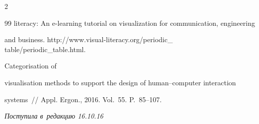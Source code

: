 \begin{multicols}{2}
{{\begin{thebibliography}{99}
literacy: An e-learning tutorial on visualization for communication, engineering 


and business. {\sf http://www.visual-literacy.org/periodic\_ table/periodic\_table.html}.




   Categorisation of 


visualisation methods to support the design of human--computer interaction 


systems~// Appl. Ergon., 2016. Vol.~55. P.~85--107.


 \end{thebibliography}





 }


 }





\end{multicols}





\vspace*{-3pt}





\hfill{\small\textit{Поступила в~редакцию 16.10.16}}










\newpage





\vspace*{-28pt}




























